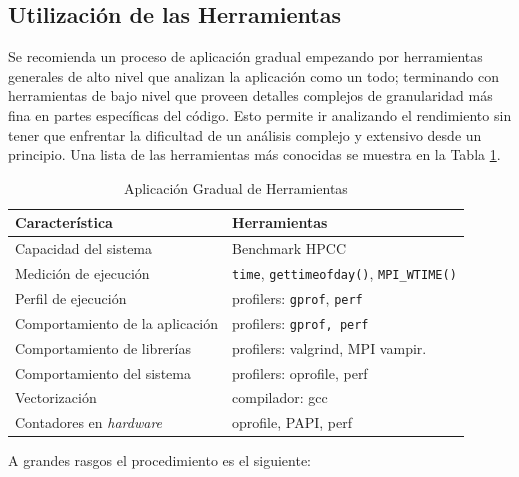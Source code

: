 \documentclass[a4paper]{report}
\begin{document}
\subsection{Utilización de las Herramientas}

Se recomienda un proceso de aplicación gradual empezando por herramientas generales de alto nivel que analizan la aplicación como un todo; terminando con herramientas de bajo nivel que proveen
detalles complejos de granularidad más fina en partes específicas del código. Esto permite ir analizando el rendimiento sin tener que enfrentar la dificultad de un análisis complejo y
extensivo desde un principio. Una lista de las herramientas más conocidas se muestra en la Tabla \ref{table:tooling}.

\begin{table}[H]
\caption{Aplicación Gradual de Herramientas}
\begin{tabular}{|l|l|} \hline
{\bf Característica} & {\bf Herramientas} \\ \hline
Capacidad del sistema & Benchmark HPCC \\ \hline
Medición de ejecución & {\tt time}, {\tt gettimeofday()}, {\tt MPI\_WTIME()} \\ \hline
Perfil de ejecución & profilers: {\tt gprof}, {\tt perf} \\ \hline
Comportamiento de la aplicación & profilers: {\tt gprof, perf} \\ \hline
Comportamiento de librerías & profilers: valgrind, MPI vampir. \\ \hline
Comportamiento del sistema & profilers: oprofile, perf \\ \hline
Vectorización & compilador: gcc \\ \hline
Contadores en {\it hardware} & oprofile, PAPI, perf \\ \hline
\end{tabular}
\label{table:tooling}
\end{table}

A grandes rasgos el procedimiento es el siguiente:
\end{document}
